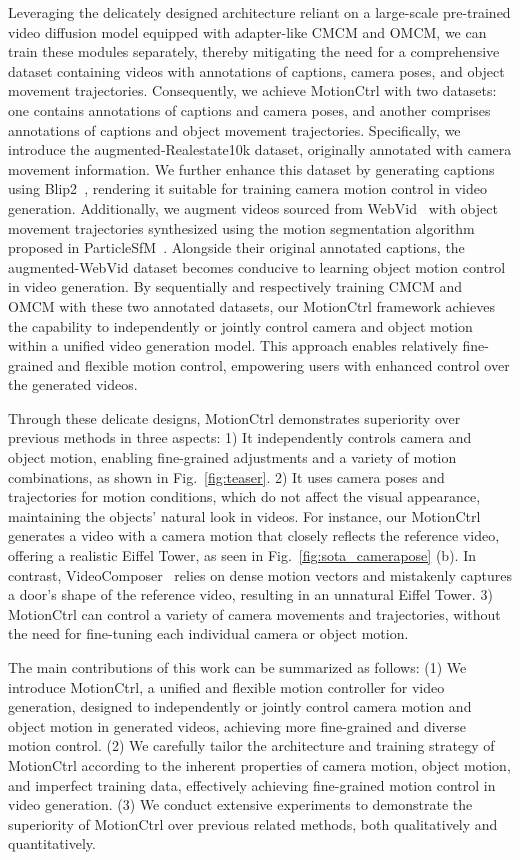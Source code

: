 \documentclass[sigconf]{acmart}
\begin{document}
Leveraging the delicately designed architecture reliant on a large-scale pre-trained video diffusion model equipped with adapter-like CMCM and OMCM, we can train these modules separately, thereby mitigating the need for a comprehensive dataset containing videos with annotations of captions, camera poses, and object movement trajectories. Consequently, we achieve MotionCtrl with two datasets: one contains annotations of captions and camera poses, and another comprises annotations of captions and object movement trajectories.
%
Specifically, we introduce the augmented-Realestate10k dataset, originally annotated with camera movement information. We further enhance this dataset by generating captions using Blip2~\cite{blip2}, rendering it suitable for training camera motion control in video generation.
%
Additionally, we augment videos sourced from WebVid~\cite{bain2021frozen} with object movement trajectories synthesized using the motion segmentation algorithm proposed in ParticleSfM~\cite{zhao2022particlesfm}. Alongside their original annotated captions, the augmented-WebVid dataset becomes conducive to learning object motion control in video generation.
%
By sequentially and respectively training CMCM and OMCM with these two annotated datasets, our MotionCtrl framework achieves the capability to independently or jointly control camera and object motion within a unified video generation model. This approach enables relatively fine-grained and flexible motion control, empowering users with enhanced control over the generated videos.

Through these delicate designs, MotionCtrl demonstrates superiority over previous methods in three aspects: 1) It independently controls camera and object motion, enabling fine-grained adjustments and a variety of motion combinations, as shown in Fig.~\ref{fig:teaser}. 2) It uses camera poses and trajectories for motion conditions, which do not affect the visual appearance, maintaining the objects' natural look in videos. For instance, our MotionCtrl generates a video with a camera motion that closely reflects the reference video, offering a realistic Eiffel Tower, as seen in Fig.~\ref{fig:sota_camerapose} (b). In contrast, VideoComposer~\cite{wang2023videocomposer} relies on dense motion vectors and mistakenly captures a door's shape of the reference video, resulting in an unnatural Eiffel Tower. 3) MotionCtrl can control a variety of camera movements and trajectories, without the need for fine-tuning each individual camera or object motion.

The main contributions of this work can be summarized as follows:
    (1) We introduce MotionCtrl, a unified and flexible motion controller for video generation, designed to independently or jointly control camera motion and object motion in generated videos, achieving more fine-grained and diverse motion control.
    (2) We carefully tailor the architecture and training strategy of MotionCtrl according to the inherent properties of camera motion, object motion, and imperfect training data, effectively achieving fine-grained motion control in video generation.
    (3) We conduct extensive experiments to demonstrate the superiority of MotionCtrl over previous related methods, both qualitatively and quantitatively.
\end{document}
